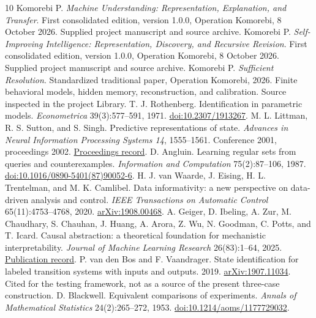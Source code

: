 \documentclass[11pt,letterpaper]{article}
\theoremstyle{plain}
\theoremstyle{definition}
\begin{document}
\clearpage{}
\begin{thebibliography}{10}\small
{} Komorebi P. \emph{Machine Understanding: Representation, Explanation, and Transfer}. First consolidated edition, version 1.0.0, Operation Komorebi, 8 October 2026. Supplied project manuscript and source archive.
 Komorebi P. \emph{Self-Improving Intelligence: Representation, Discovery, and Recursive Revision}. First consolidated edition, version 1.0.0, Operation Komorebi, 8 October 2026. Supplied project manuscript and source archive.
 Komorebi P. \emph{Sufficient Resolution}. Standardized traditional paper, Operation Komorebi, 2026. Finite behavioral models, hidden memory, reconstruction, and calibration. Source inspected in the project Library.
 T. J. Rothenberg. Identification in parametric models. \emph{Econometrica} 39(3):577--591, 1971. \href{https://www.jstor.org/stable/1913267}{doi:10.2307/1913267}.
 M. L. Littman, R. S. Sutton, and S. Singh. Predictive representations of state. \emph{Advances in Neural Information Processing Systems 14}, 1555--1561. Conference 2001, proceedings 2002. \href{https://papers.nips.cc/paper_files/paper/2001/hash/1e4d36177d71bbb3558e43af9577d70e-Abstract.html}{Proceedings record}.
 D. Angluin. Learning regular sets from queries and counterexamples. \emph{Information and Computation} 75(2):87--106, 1987. \href{https://doi.org/10.1016/0890-5401(87)90052-6}{doi:10.1016/0890-5401(87)90052-6}.
 H. J. van Waarde, J. Eising, H. L. Trentelman, and M. K. Camlibel. Data informativity: a new perspective on data-driven analysis and control. \emph{IEEE Transactions on Automatic Control} 65(11):4753--4768, 2020. \href{https://arxiv.org/abs/1908.00468}{arXiv:1908.00468}.
 A. Geiger, D. Ibeling, A. Zur, M. Chaudhary, S. Chauhan, J. Huang, A. Arora, Z. Wu, N. Goodman, C. Potts, and T. Icard. Causal abstraction: a theoretical foundation for mechanistic interpretability. \emph{Journal of Machine Learning Research} 26(83):1--64, 2025. \href{https://jmlr.org/papers/v26/23-0058.html}{Publication record}.
 P. van den Bos and F. Vaandrager. State identification for labeled transition systems with inputs and outputs. 2019. \href{https://arxiv.org/abs/1907.11034}{arXiv:1907.11034}. Cited for the testing framework, not as a source of the present three-case construction.
 D. Blackwell. Equivalent comparisons of experiments. \emph{Annals of Mathematical Statistics} 24(2):265--272, 1953. \href{https://doi.org/10.1214/aoms/1177729032}{doi:10.1214/aoms/1177729032}.
\end{thebibliography}
\end{document}
